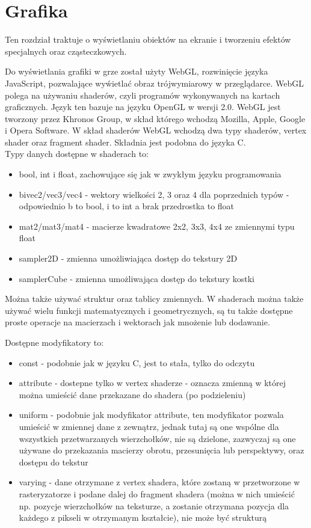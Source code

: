 \chapter{Grafika}
\thispagestyle{chapterBeginStyle}
\label{ch:graphics}

Ten rozdział traktuje o wy\'swietlaniu obiektów na ekranie i tworzeniu efektów specjalnych oraz cząsteczkowych.

Do wy\'swietlania grafiki w grze został użyty WebGL, rozwinięcie języka JavaScript, pozwalające wy\'wietlać obraz trójwymiarowy w przeglądarce. WebGL polega na używaniu shaderów, czyli programów wykonywanych na kartach graficznych. Język ten bazuje na języku OpenGL w wersji 2.0. WebGL jest tworzony przez Khronos Group, w skład którego wchodzą Mozilla, Apple, Google i Opera Software. W skład shaderów WebGL wchodzą dwa typy shaderów, vertex shader oraz fragment shader. Składnia jest podobna do języka C.\\
Typy danych dostępne w shaderach to:\begin{itemize}[topsep=0.2em, itemsep=0.5em, partopsep=0em, parsep=0em]
	\item bool, int i float, zachowujące się jak w zwykłym języku programowania
	\item \lbrack bi\rbrack vec2/vec3/vec4 - wektory wielko\'sci 2, 3 oraz 4 dla poprzednich typów - odpowiednio b to bool, i to int a brak przedrostka to float
	\item mat2/mat3/mat4 - macierze kwadratowe 2x2, 3x3, 4x4 ze zmiennymi typu float
	\item sampler2D - zmienna umożliwiająca dostęp do tekstury 2D
	\item samplerCube - zmienna umożliwająca dostęp do tekstury kostki
\end{itemize}
Można także używać struktur oraz tablicy zmiennych. W shaderach można także używać wielu funkcji matematycznych i geometrycznych, są tu także dostępne proste operacje na macierzach i wektorach jak mnożenie lub dodawanie.

Dostępne modyfikatory to:\begin{itemize}[topsep=0.2em, itemsep=0.5em, partopsep=0em, parsep=0em]
	\item const - podobnie jak w języku C, jest to stała, tylko do odczytu
	\item attribute - dostepne tylko w vertex shaderze - oznacza zmienną w której można umie\'scić dane przekazane do shadera (po podzieleniu)
	\item uniform - podobnie jak modyfikator attribute, ten modyfikator pozwala umie\'scić w zmiennej dane z zewnątrz, jednak tutaj są one wspólne dla wszystkich przetwarzanych wierzchołków, nie są dzielone, zazwyczaj są one używane do przekazania macierzy obrotu, przesunięcia lub perspektywy, oraz dostępu do tekstur
	\item varying - dane otrzymane z vertex shadera, które zostaną w przetworzone w rasteryzatorze i podane dalej do fragment shadera (można w nich umie\'scić np. pozycje wierzchołków na teksturze, a zostanie otrzymana pozycja dla każdego z pikseli w otrzymanym kształcie), nie może być strukturą
\end{itemize}

